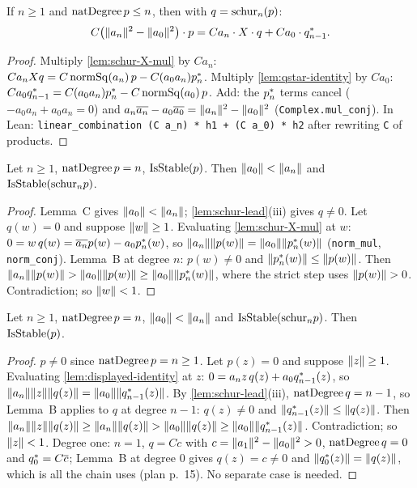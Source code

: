 \begin{lemma}\label{lem:displayed-identity}
If $n\ge1$ and $\natdeg\,p\le n$, then with $q=\Sch_n(p)$:
\[ C\big(\nm{a_n}^2-\nm{a_0}^2\big)\cdot p = C a_n\cdot X\cdot q+C a_0\cdot\crec{n-1}q. \]
\end{lemma}
\begin{proof}
Multiply \ref{lem:schur-X-mul} by $C a_n$:
$C a_n X q=C\,\mathrm{normSq}(a_n)\,p-C(a_0a_n)\crec np$. Multiply
\ref{lem:qstar-identity} by $C a_0$:
$C a_0\crec{n-1}q=C(a_0a_n)\crec np-C\,\mathrm{normSq}(a_0)\,p$. Add: the
$\crec np$ terms cancel ($-a_0a_n+a_0a_n=0$) and
$a_n\cj{a_n}-a_0\cj{a_0}=\nm{a_n}^2-\nm{a_0}^2$ (\texttt{Complex.mul\_conj}).
In Lean: \texttt{linear\_combination (C a\_n) * h1 + (C a\_0) * h2} after
rewriting \texttt{C} of products.
\end{proof}

\begin{lemma}\label{lem:step-mp}
Let $n\ge1$, $\natdeg\,p=n$, $\stable(p)$. Then $\nm{a_0}<\nm{a_n}$ and
$\stable(\Sch_n p)$.
\end{lemma}
\begin{proof}
Lemma~C gives $\nm{a_0}<\nm{a_n}$; \ref{lem:schur-lead}(iii) gives $q\ne0$.
Let $q(w)=0$ and suppose $\nm w\ge1$. Evaluating \ref{lem:schur-X-mul} at $w$:
$0=w\,q(w)=\cj{a_n}p(w)-a_0\crec np(w)$, so
$\nm{a_n}\nm{p(w)}=\nm{a_0}\nm{\crec np(w)}$ (\texttt{norm\_mul},
\texttt{norm\_conj}). Lemma~B at degree $n$: $p(w)\ne0$ and
$\nm{\crec np(w)}\le\nm{p(w)}$. Then
$\nm{a_n}\nm{p(w)}>\nm{a_0}\nm{p(w)}\ge\nm{a_0}\nm{\crec np(w)}$, where the
strict step uses $\nm{p(w)}>0$. Contradiction; so $\nm w<1$.
\end{proof}

\begin{lemma}\label{lem:step-mpr}
Let $n\ge1$, $\natdeg\,p=n$, $\nm{a_0}<\nm{a_n}$ and $\stable(\Sch_n p)$. Then
$\stable(p)$.
\end{lemma}
\begin{proof}
$p\ne0$ since $\natdeg\,p=n\ge1$. Let $p(z)=0$ and suppose $\nm z\ge1$.
Evaluating \ref{lem:displayed-identity} at $z$:
$0=a_n z\,q(z)+a_0\crec{n-1}q(z)$, so
$\nm{a_n}\nm z\nm{q(z)}=\nm{a_0}\nm{\crec{n-1}q(z)}$. By
\ref{lem:schur-lead}(iii), $\natdeg\,q=n-1$, so Lemma~B applies to $q$ at
degree $n-1$: $q(z)\ne0$ and $\nm{\crec{n-1}q(z)}\le\nm{q(z)}$. Then
$\nm{a_n}\nm z\nm{q(z)}\ge\nm{a_n}\nm{q(z)}>\nm{a_0}\nm{q(z)}\ge\nm{a_0}\nm{\crec{n-1}q(z)}$.
Contradiction; so $\nm z<1$. Degree one: $n=1$, $q=C c$ with
$c=\nm{a_1}^2-\nm{a_0}^2>0$, $\natdeg\,q=0$ and $\crec0q=C\cj c$; Lemma~B at
degree $0$ gives $q(z)=c\ne0$ and $\nm{q^*_0(z)}=\nm{q(z)}$, which is all the
chain uses (plan p.~15). No separate case is needed.
\end{proof}

